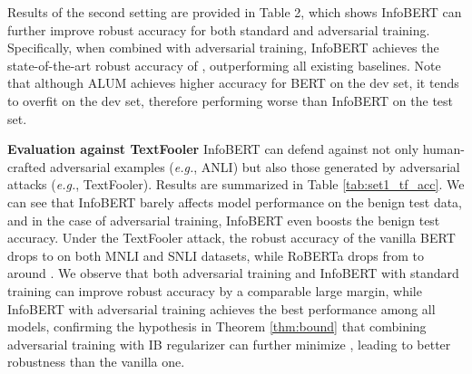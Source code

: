 \documentclass{article} \usepackage{iclr2021_conference,times}
\theoremstyle{definition}
\theoremstyle{remark}
\newcommand{\method}{InfoBERT\xspace}
\begin{document}
Results of the second setting are provided in Table 2, which shows \method can further improve robust accuracy for both standard and adversarial training. Specifically, when combined with adversarial training, \method achieves the state-of-the-art robust accuracy of , outperforming all 
existing baselines. Note that although ALUM achieves higher accuracy for BERT on the dev set, it tends to overfit on the dev set, therefore performing  worse than \method on the test set. 

\textbf{Evaluation against TextFooler} \method can defend against not only human-crafted adversarial examples (\emph{e.g.}, ANLI) but also those generated by adversarial attacks (\emph{e.g.}, TextFooler). Results are summarized in Table \ref{tab:set1_tf_acc}. We can see that \method barely affects model performance on the benign test data, and in the case of adversarial training, \method even boosts the benign test accuracy. Under the TextFooler attack, the robust accuracy of the vanilla BERT drops to  on both MNLI and SNLI datasets, while RoBERTa drops from  to around . We observe that both adversarial training and \method with standard training can improve robust accuracy by a comparable large margin, while \method with adversarial training achieves the best performance among all models, confirming the hypothesis in Theorem \ref{thm:bound} that combining adversarial training with IB regularizer can further minimize ,  leading to better robustness than the vanilla one.
\end{document}

